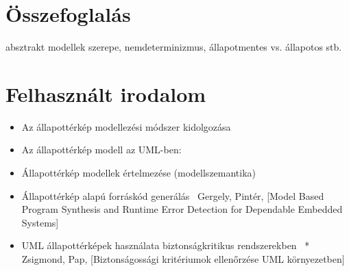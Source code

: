 \begin{landscape}
\end{landscape}

\section{Összefoglalás}

absztrakt modellek szerepe, nemdeterminizmus, állapotmentes vs. állapotos stb.

\section*{Felhasznált irodalom}

\begin{itemize}
	\item Az állapottérkép modellezési módszer kidolgozása~\cite{DBLP:journals/scp/Harel87, DBLP:conf/hopl/Harel07}
	\item Az állapottérkép modell az UML-ben:
	\item Állapottérkép modellek értelmezése (modellszemantika)~\cite{DBLP:conf/fmoods/LatellaMM99, DBLP:conf/acsd/DubrovinJ08, DBLP:conf/lics/HarelPSS87}
	\item Állapottérkép alapú forráskód generálás~\cite{samak2008practical}
	 Gergely, Pintér, [Model Based Program Synthesis and Runtime Error Detection for Dependable Embedded Systems]%
	\item UML állapottérképek használata biztonságkritikus rendszerekben~\cite{knight1997formal, DBLP:conf/icre/NobeW96}
	* Zsigmond, Pap, [Biztonságossági kritériumok ellenőrzése UML környezetben]%
\end{itemize}


